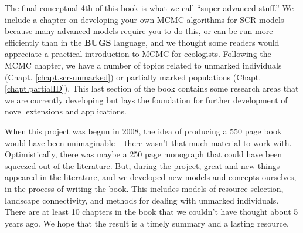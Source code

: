 The final conceptual 4th of this book is what we call
``super-advanced stuff.''%
We include a
chapter on developing your own MCMC algorithms for SCR models because
many advanced models require you to do this, or can be run more efficiently than in the {\bf BUGS} language, and we thought some
readers would appreciate a practical introduction to MCMC for ecologists.
Following the MCMC chapter, we have a number
of topics related to unmarked individuals 
(Chapt. \ref{chapt.scr-unmarked}) or partially marked populations
(Chapt. \ref{chapt.partialID}). This last section of the book contains some research areas that we are
currently developing but lays the foundation for 
further development of novel extensions and applications.


When this project was begun in 2008, the idea of producing a 550 page
book would have been unimaginable -- there wasn't that much material
to work with.  Optimistically, there was maybe a 250 page monograph that
could have been squeezed out of the literature.  But, during the project,
great and new things appeared in the literature, and we developed new
models and concepts ourselves, in the process of writing the book. This includes models of resource selection,
landscape connectivity, and methods for dealing with unmarked
individuals. There are at least 10 chapters in the book that we
couldn't have thought about 5 years ago. We hope that the result is a
timely summary and a lasting resource.



